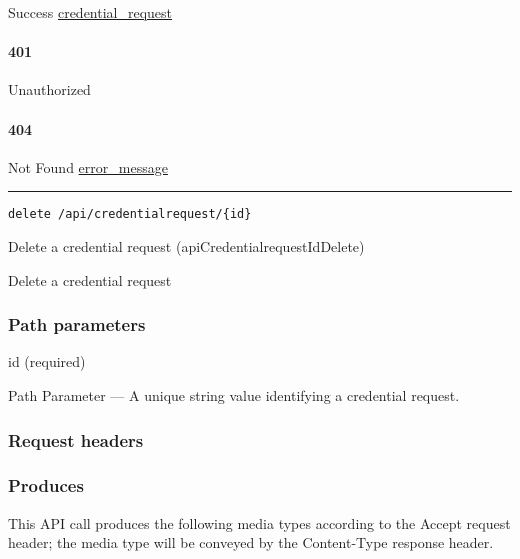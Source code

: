Success \protect\hyperlink{credential_request}{credential\_request}

\hypertarget{section-393}{%
\paragraph{401}\label{section-393}}

Unauthorized \protect\hyperlink{}{}

\hypertarget{section-394}{%
\paragraph{404}\label{section-394}}

Not Found \protect\hyperlink{error_message}{error\_message}

\begin{center}\rule{0.5\linewidth}{\linethickness}\end{center}

\protect\hypertarget{apiCredentialrequestIdDelete}{}{}

\begin{verbatim}
delete /api/credentialrequest/{id}
\end{verbatim}

Delete a credential request ({apiCredentialrequestIdDelete})

Delete a credential request

\hypertarget{path-parameters-63}{%
\subsubsection{Path parameters}\label{path-parameters-63}}

id (required)

{Path Parameter} --- A unique string value identifying a credential
request.

\hypertarget{request-headers-69}{%
\subsubsection{Request headers}\label{request-headers-69}}

\hypertarget{produces-118}{%
\subsubsection{Produces}\label{produces-118}}

This API call produces the following media types according to the
{Accept} request header; the media type will be conveyed by the
{Content-Type} response header.


